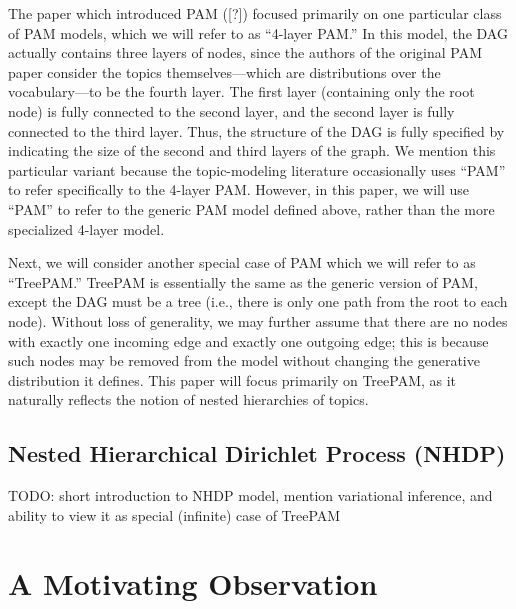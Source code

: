 \documentclass{article}
\theoremstyle{definition}
\newcommand{\TODOcite}{[?]}
\begin{document}
The paper which introduced PAM (\TODOcite{}) focused primarily on one particular class of PAM models, which we will refer to as ``4-layer PAM.''
In this model, the DAG actually contains three layers of nodes, since the authors of the original PAM paper consider the topics themselves---which are distributions over the vocabulary---to be the fourth layer.
The first layer (containing only the root node) is fully connected to the second layer, and the second layer is fully connected to the third layer.
Thus, the structure of the DAG is fully specified by indicating the size of the second and third layers of the graph.
We mention this particular variant because the topic-modeling literature occasionally uses ``PAM'' to refer specifically to the 4-layer PAM.
However, in this paper, we will use ``PAM'' to refer to the generic PAM model defined above, rather than the more specialized 4-layer model.

Next, we will consider another special case of PAM which we will refer to as ``TreePAM.''
TreePAM is essentially the same as the generic version of PAM, except the DAG must be a tree (i.e., there is only one path from the root to each node).
Without loss of generality, we may further assume that there are no nodes with exactly one incoming edge and exactly one outgoing edge; this is because such nodes may be removed from the model without changing the generative distribution it defines.
This paper will focus primarily on TreePAM, as it naturally reflects the notion of nested hierarchies of topics.

\subsection{Nested Hierarchical Dirichlet Process (NHDP)}

TODO: short introduction to NHDP model, mention variational inference, and ability to view it as special (infinite) case of TreePAM

\section{A Motivating Observation}
\end{document}
